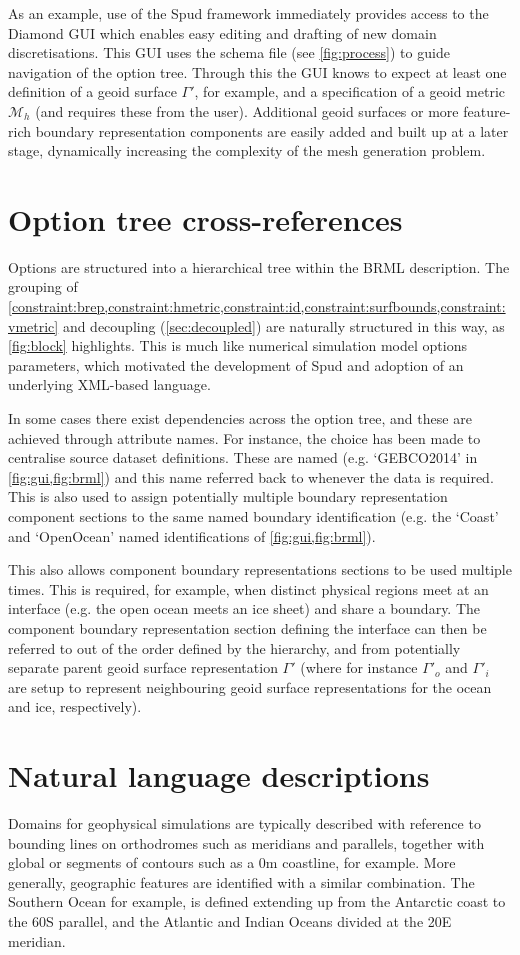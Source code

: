 \documentclass[a4paper, 10pt]{book}
\providecommand{\brml}{BRML\xspace}
\providecommand{\brep}{boundary representation\xspace}
\providecommand{\breps}{boundary representations\xspace}
\newcommand{\constraints}{\cref{constraint:brep,constraint:hmetric,constraint:id,constraint:surfbounds,constraint:vmetric}\xspace}
\begin{document}
As an example, use of the Spud framework immediately provides access to the Diamond GUI
which enables easy editing and drafting of new domain discretisations.
%
This GUI uses the schema file (see \cref{fig:process}) to guide navigation of the option tree.
%
Through this the GUI knows to expect at least one definition of a geoid surface $\Gamma'$, for example, and a specification of a geoid metric $\mathcal{M}_h$
(and requires these from the user). 
%
Additional geoid surfaces or more feature-rich boundary representation components are easily added and built up at a later stage, dynamically increasing the complexity of the mesh generation problem.

\section{Option tree cross-references}
Options are structured into a hierarchical tree within the \brml description.
%
The grouping of \constraints and decoupling (\cref{sec:decoupled})
are naturally structured in this way, as \cref{fig:block} highlights.
This is much like numerical simulation model options parameters,
which motivated the development of Spud and adoption of an underlying XML-based language.
%

In some cases there exist dependencies across the option tree,
and these are achieved through attribute names.
For instance, the choice has been made to centralise source dataset definitions.
These are named (e.g. `GEBCO2014' in \cref{fig:gui,fig:brml}) and this name referred back to whenever the data is required.
This is also used to assign potentially multiple \brep component sections to the 
same named boundary identification (e.g. the `Coast' and `OpenOcean' named identifications of \cref{fig:gui,fig:brml}).

This also allows component \breps sections to be used multiple times.
This is required, for example, when distinct physical regions meet at an interface
(e.g. the open ocean meets an ice sheet) and share a boundary.
%
The component \brep section defining the interface can then be referred to out of the order defined by the hierarchy,
and from potentially separate parent geoid surface representation
$\Gamma'$
(where for instance $\Gamma'_o$ and $\Gamma'_i$ are setup to represent neighbouring geoid surface representations for the ocean and ice, respectively).




\section{Natural language descriptions}
%
Domains for geophysical simulations are typically described with reference to bounding lines on orthodromes such as meridians and parallels,
together with global or segments of contours such as a 0m coastline, for example.
%
More generally, geographic features are identified with a similar combination.
The Southern Ocean for example, is defined extending up from the Antarctic coast to the 60\degree S parallel, and the Atlantic and Indian Oceans divided at the 20\degree E meridian.
%
\end{document}

